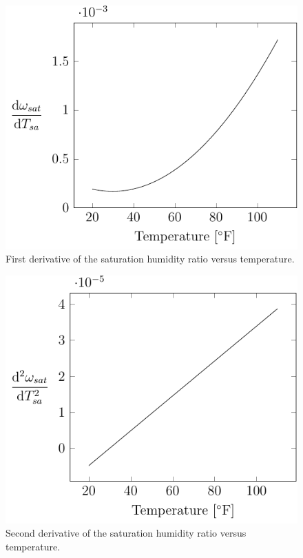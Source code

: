 \begin{figure}
\centering
\includegraphics{Plots/45-FirstDerivativeSaturatedHumidityVsTemperature/firstDerivativeSaturatedHumidity.pdf}
\caption{First derivative of the saturation humidity ratio versus temperature.}
\label{fig:firstDeriviativeSaturationHumidityRatioVsTemperature}
\end{figure}

\begin{figure}
\centering
\includegraphics{Plots/46-SecondDerivativeSaturatedHumidityVsTemperature/secondDerivativeSaturatedHumidity.pdf}
\caption{Second derivative of the saturation humidity ratio versus temperature.}
\label{fig:secondDeriviativeSaturationHumidityRatioVsTemperature}
\end{figure}

